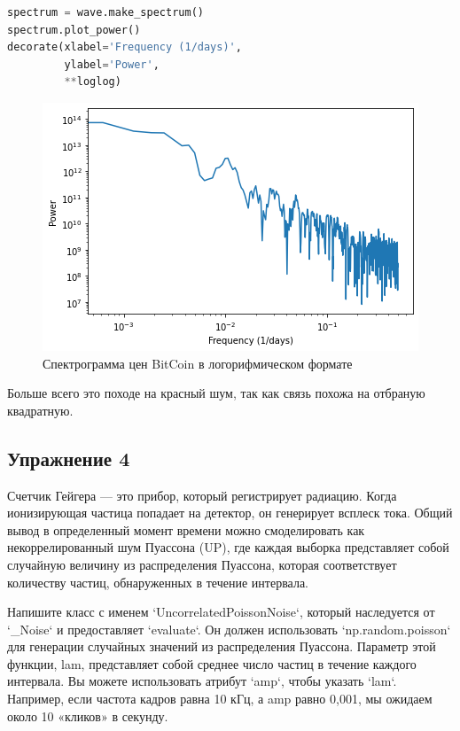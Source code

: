 \begin{lstlisting}[language=Python]
spectrum = wave.make_spectrum()
spectrum.plot_power()
decorate(xlabel='Frequency (1/days)',
         ylabel='Power', 
         **loglog)
\end{lstlisting}
\begin{figure}[H]
	\begin{center}
		\includegraphics[scale=1]{fig/lab04/lab04_32_0.png}
		\caption{Спектрограмма цен BitCoin в логорифмическом формате}
	\end{center}
\end{figure}

Больше всего это походе на красный шум, так как связь похожа на отбраную квадратную.

\subsection{Упражнение 4}

Счетчик Гейгера — это прибор, который регистрирует радиацию. Когда ионизирующая частица попадает на детектор, он генерирует всплеск тока. Общий вывод в определенный момент времени можно смоделировать как некоррелированный шум Пуассона (UP), где каждая выборка представляет собой случайную величину из распределения Пуассона, которая соответствует количеству частиц, обнаруженных в течение интервала.

Напишите класс с именем `UncorrelatedPoissonNoise`, который наследуется от `\_Noise` и предоставляет `evaluate`. Он должен использовать `np.random.poisson` для генерации случайных значений из распределения Пуассона. Параметр этой функции, lam, представляет собой среднее число частиц в течение каждого интервала. Вы можете использовать атрибут `amp`, чтобы указать `lam`. Например, если частота кадров равна 10 кГц, а amp равно 0,001, мы ожидаем около 10 «кликов» в секунду.

